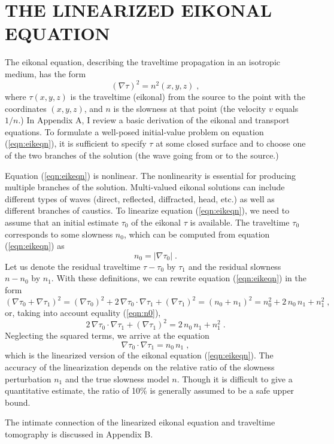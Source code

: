 \section{THE LINEARIZED EIKONAL EQUATION}

The eikonal equation, describing the traveltime propagation in an
isotropic medium, has the form
\begin{equation}
\left(\nabla \tau\right)^2 = n^2(x,y,z)\;,
\label{eqn:eikeqn}
\end{equation}
where $\tau (x,y,z)$ is the traveltime (eikonal) from the source to
the point with the coordinates $(x, y, z)$, and $n$ is the slowness at
that point (the velocity $v$ equals $1/n$.) In Appendix A, I review a
basic derivation of the eikonal and transport equations. To formulate
a well-posed initial-value problem on equation (\ref{eqn:eikeqn}), it is
sufficient to specify $\tau$ at some closed surface and to choose one
of the two branches of the solution (the wave going from or to the
source.)
\par
Equation (\ref{eqn:eikeqn}) is nonlinear. The nonlinearity is essential for
producing multiple branches of the solution. Multi-valued eikonal
solutions can include different types of waves (direct, reflected,
diffracted, head, etc.) as well as different branches of caustics.  To
linearize equation (\ref{eqn:eikeqn}), we need to assume that an initial
estimate $\tau_0$ of the eikonal $\tau$ is available. The traveltime
$\tau_0$ corresponds to some slowness $n_0$, which can be computed
from equation (\ref{eqn:eikeqn}) as
\begin{equation}
n_0 = \left|\nabla \tau_0\right|\;.
\label{eqn:n0}
\end{equation}
Let us denote the residual traveltime $\tau - \tau_0$ by $\tau_1$ and
the residual slowness $n - n_0$ by $n_1$. With these definitions, we
can rewrite equation (\ref{eqn:eikeqn}) in the form
\begin{equation}
\left(\nabla \tau_0 + \nabla \tau_1 \right)^2 = 
\left(\nabla \tau_0\right)^2 + 
2\,\nabla \tau_0 \cdot  \nabla \tau_1 +
\left(\nabla \tau_1\right)^2 =
(n_0 + n_1)^2  = n_0^2 + 2\,n_0\,n_1 + n_1^2\;,
\label{eqn:eik1}
\end{equation}
or, taking into account equality (\ref{eqn:n0}),
\begin{equation}
2\,\nabla \tau_0 \cdot  \nabla \tau_1 +
\left(\nabla \tau_1\right)^2 = 2\,n_0\,n_1 + n_1^2\;.
\label{eqn:eik2}
\end{equation} 
Neglecting the squared terms, we arrive at the equation
\begin{equation}
\nabla \tau_0 \cdot  \nabla \tau_1 = 
n_0\,n_1\;,
\label{eqn:lineik}
\end{equation} 
which is the linearized version of the eikonal equation (\ref{eqn:eikeqn}).
The accuracy of the linearization depends on the relative ratio of the
slowness perturbation $n_1$ and the true slowness model $n$. Though it
is difficult to give a quantitative estimate, the ratio of 10\% is
generally assumed to be a safe upper bound.
\par
The intimate connection of the linearized eikonal equation
and traveltime tomography is discussed in Appendix B.

